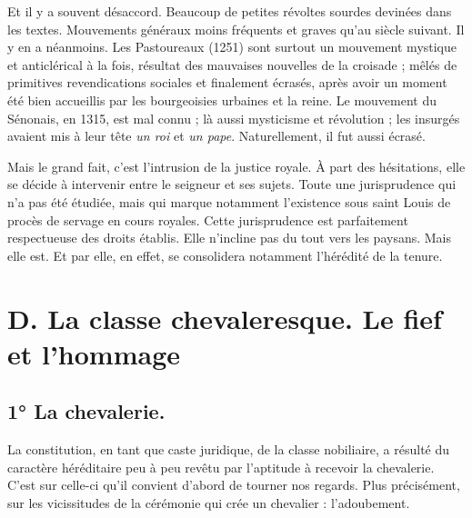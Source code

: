 \documentclass[french,twoside]{book} %
\begin{document}
Et il y a souvent désaccord. Beaucoup de petites révoltes sourdes devinées dans les textes. Mouvements généraux moins fréquents et graves qu’au siècle suivant. Il y en a néanmoins. Les Pastoureaux (1251) sont surtout un mouvement mystique et anticlérical à la fois, résultat des mauvaises nouvelles de la croisade ; mêlés de primitives revendications sociales et finalement écrasés, après avoir un moment été bien accueillis par les bourgeoisies urbaines et la reine. Le mouvement du Sénonais, en 1315, est mal connu ; là aussi mysticisme et révolution ; les insurgés avaient mis à leur tête \emph{un roi} et \emph{un pape}. Naturellement, il fut aussi écrasé.\par
Mais le grand fait, c’est l’intrusion de la justice royale. À part des hésitations, elle se décide à intervenir entre le seigneur et ses sujets. Toute une jurisprudence qui n’a pas été étudiée, mais qui marque notamment l’existence sous saint Louis de procès de servage en cours royales. Cette jurisprudence est parfaitement respectueuse des droits établis. Elle n’incline pas du tout vers les paysans. Mais elle est. Et par elle, en effet, se consolidera notamment l’hérédité de la tenure.
\section[D. La classe chevaleresque. Le fief et l’hommage]{D. La classe chevaleresque. Le fief et l’hommage}
\label{c07d}
\subsection[1° La chevalerie.]{1° La chevalerie. \protect\footnotemark}
\noindent La constitution, en tant que caste juridique, de la classe nobiliaire, a résulté du caractère héréditaire peu à peu revêtu par l’aptitude à recevoir la chevalerie. C’est sur celle-ci qu’il convient d’abord de tourner nos regards. Plus précisément, sur les vicissitudes de la cérémonie qui crée un chevalier : l’adoubement.\par
\end{document}
